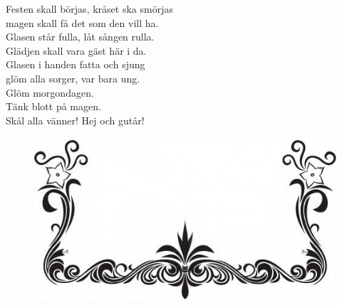 \documentclass[a6paper, 10pt, twoside]{article}
\begin{document}
\noindent
{}
\small
\begin{center}
\end{center}
\begin{lyrics}
Festen skall börjas, kråset ska smörjas\\
magen skall få det som den vill ha.\\
Glasen står fulla, låt sången rulla.\\
Glädjen skall vara gäst här i da.
\vspace{5pt}\\
Glasen i handen fatta och sjung\\
glöm alla sorger, var bara ung.\\
Glöm morgondagen.\\
Tänk blott på magen.\\
Skål alla vänner! Hej och gutår!
\end{lyrics}
\vfill
\begin{figure}[!h]
\centering
\includegraphics[width=1.0\textwidth]{fin.jpg}
\end{figure}
\end{document}
